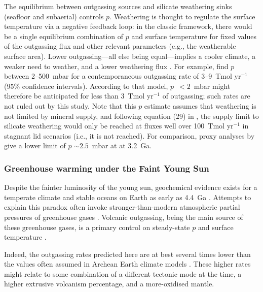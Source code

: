 The equilibrium between outgassing sources and silicate weathering sinks (seafloor and subaerial) controls $p$. Weathering is thought to regulate the surface temperature via a negative feedback loop: in the classic \citet{Walker1981} framework, there would be a single equilibrium combination of $p$ and surface temperature for fixed values of the outgassing flux and other relevant parameters (e.g., the weatherable surface area). Lower outgassing---all else being equal---implies a cooler climate, a weaker need to weather, and a lower  weathering flux \citep[e.g.,][]{Kadoya2014, KT2018}. For example, \citet{KT2018} find $p$ between 2--500~mbar for a contemporaneous outgassing rate of 3--9~Tmol yr$^{-1}$ (95\% confidence intervals). According to that model, $p$~$< 2$~mbar might therefore be anticipated for less than 3~Tmol yr$^{-1}$ of outgassing; such rates are not ruled out by this study. Note that this $p$ estimate assumes that weathering is not limited by mineral supply, and following equation (29) in \citet{foley_carbon_2018}, the supply limit to silicate weathering would only be reached at  fluxes well over 100~Tmol yr$^{-1}$ in stagnant lid scenarios (i.e., it is not reached). For comparison, proxy analyses by \citet{Hessler2004} give a lower limit of $p$ $\sim 2.5$~mbar at at 3.2~Ga.






\subsubsection{Greenhouse warming under the Faint Young Sun}

Despite the fainter luminosity of the young sun, geochemical evidence exists for a temperate climate and stable oceans on Earth as early as 4.4~Ga \citep[e.g.,][]{Wilde2001, Valley2002, Valley2014}. Attempts to explain this paradox often invoke stronger-than-modern atmospheric partial pressures of greenhouse gases \citep[see review in][]{charnay2020}. Volcanic outgassing, being the main source of these greenhouse gases, is a primary control on steady-state $p$ and surface temperature \citep[e.g.,][]{Walker1981, Sleep2001, Kadoya2014, honing_carbon_2019}. 


Indeed, the  outgassing rates predicted here are at best several times lower than the values often assumed in Archean Earth climate models \citep[e.g.][]{Sleep2001, Wordsworth2013, CHARNAY2017, KANZAKI2018, KT2018}. These higher rates might relate to some combination of a different tectonic mode at the time, a higher extrusive volcanism percentage, and a more-oxidised mantle. 




